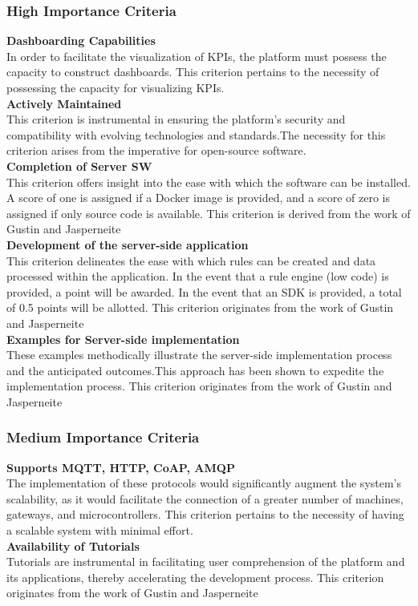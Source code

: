 \subsubsection{High Importance Criteria}
\textbf{Dashboarding Capabilities}\\
In order to facilitate the visualization of KPIs, the platform must possess the capacity to construct dashboards. This criterion pertains to the necessity of possessing the capacity for visualizing KPIs.\\
\textbf{Actively Maintained}\\
This criterion is instrumental in ensuring the platform's security and compatibility with evolving technologies and standards.The necessity for this criterion arises from the imperative for open-source software.\\
\textbf{Completion of Server SW}\\
This criterion offers insight into the ease with which the software can be installed. A score of one is assigned if a Docker image is provided, and a score of zero is assigned if only source code is available. This criterion is derived from the work of Gustin and Jasperneite\\
\textbf{Development of the server-side application}\\
This criterion delineates the ease with which rules can be created and data processed within the application. In the event that a rule engine (low code) is provided, a point will be awarded. In the event that an SDK is provided, a total of 0.5 points will be allotted. This criterion originates from the work of Gustin and Jasperneite\\
\textbf{Examples for Server-side implementation}\\
These examples methodically illustrate the server-side implementation process and the anticipated outcomes.This approach has been shown to expedite the implementation process.
This criterion originates from the work of Gustin and Jasperneite

\subsubsection{Medium Importance Criteria}
\textbf{Supports MQTT, HTTP, CoAP, AMQP}\\
The implementation of these protocols would significantly augment the system's scalability, as it would facilitate the connection of a greater number of machines, gateways, and microcontrollers. This criterion pertains to the necessity of having a scalable system with minimal effort.\\
\textbf{Availability of Tutorials}\\
Tutorials are instrumental in facilitating user comprehension of the platform and its applications, thereby accelerating the development process. This criterion originates from the work of Gustin and Jasperneite


